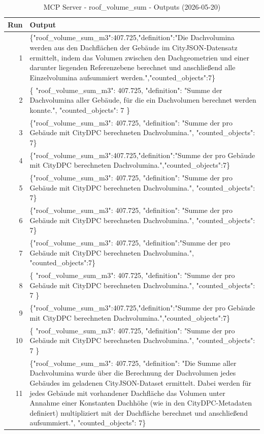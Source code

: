 \documentclass[a4paper,11pt]{article}
\begin{document}
\begin{table}[ht]
\centering
\scriptsize
\caption{MCP Server - roof\_volume\_sum - Outputs (2026-05-20)}
\label{tab:mcp\_roof\_volume\_sum\_outputs\_2026-05-20}
\begin{tabular}{r p{12cm}}
\hline
Run & Output \\
\hline
1 & \{"roof\_volume\_sum\_m3":407.725,"definition":"Die Dachvolumina werden aus den Dachflächen der Gebäude im CityJSON‑Datensatz ermittelt, indem das Volumen zwischen den Dachgeometrien und einer darunter liegenden Referenzebene berechnet und anschließend alle Einzelvolumina aufsummiert werden.","counted\_objects":7\} \\
2 & \{
  "roof\_volume\_sum\_m3": 407.725,
  "definition": "Summe der Dachvolumina aller Gebäude, für die ein Dachvolumen berechnet werden konnte.",
  "counted\_objects": 7
\} \\
3 & \{"roof\_volume\_sum\_m3": 407.725, "definition": "Summe der pro Gebäude mit CityDPC berechneten Dachvolumina.", "counted\_objects": 7\} \\
4 & \{"roof\_volume\_sum\_m3":407.725,"definition":"Summe der pro Gebäude mit CityDPC berechneten Dachvolumina.","counted\_objects":7\} \\
5 & \{"roof\_volume\_sum\_m3": 407.725, "definition": "Summe der pro Gebäude mit CityDPC berechneten Dachvolumina.", "counted\_objects": 7\} \\
6 & \{"roof\_volume\_sum\_m3": 407.725, "definition": "Summe der pro Gebäude mit CityDPC berechneten Dachvolumina.", "counted\_objects": 7\} \\
7 & \{"roof\_volume\_sum\_m3": 407.725, "definition":"Summe der pro Gebäude mit CityDPC berechneten Dachvolumina.", "counted\_objects":7\} \\
8 & \{
  "roof\_volume\_sum\_m3": 407.725,
  "definition": "Summe der pro Gebäude mit CityDPC berechneten Dachvolumina.",
  "counted\_objects": 7
\} \\
9 & \{"roof\_volume\_sum\_m3":407.725,"definition":"Summe der pro Gebäude mit CityDPC berechneten Dachvolumina.","counted\_objects":7\} \\
10 & \{
  "roof\_volume\_sum\_m3": 407.725,
  "definition": "Summe der pro Gebäude mit CityDPC berechneten Dachvolumina.",
  "counted\_objects": 7
\} \\
11 & \{"roof\_volume\_sum\_m3": 407.725, "definition": "Die Summe aller Dachvolumina wurde über die Berechnung der Dachvolumen jedes Gebäudes im geladenen CityJSON-Dataset ermittelt. Dabei werden für jedes Gebäude mit vorhandener Dachfläche das Volumen unter Annahme einer Konstanten Dachhöhe (wie in den CityDPC-Metadaten definiert) multipliziert mit der Dachfläche berechnet und anschließend aufsummiert.", "counted\_objects": 7\} \\

\end{tabular}
\end{table}
\end{document}
